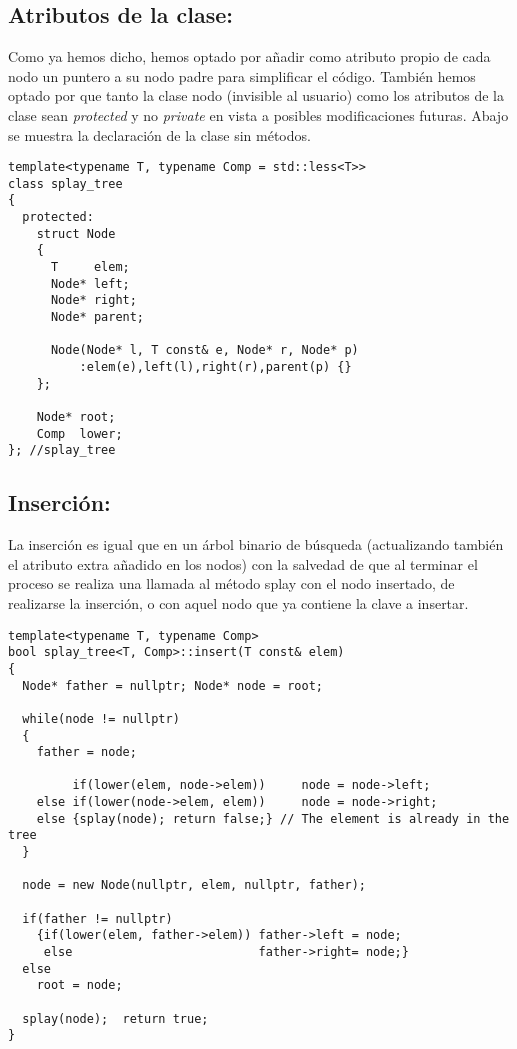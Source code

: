 \documentclass[letterpaper,12pt]{article}
\begin{document}
\subsection{Atributos de la clase:}

Como ya hemos dicho, hemos optado por añadir como atributo propio de cada nodo
un puntero a su nodo padre para simplificar el código. También hemos optado
por que tanto la clase nodo (invisible al usuario) como los atributos de la 
clase sean \textit{protected} y no \textit{private} en vista a posibles 
modificaciones futuras. Abajo se muestra la declaración de la clase sin
métodos.

\begin{lstlisting}
template<typename T, typename Comp = std::less<T>>
class splay_tree
{
  protected:
    struct Node
    {
      T     elem;
      Node* left;
      Node* right;
      Node* parent;

      Node(Node* l, T const& e, Node* r, Node* p) 
          :elem(e),left(l),right(r),parent(p) {}
    };

    Node* root;
    Comp  lower;
}; //splay_tree
\end{lstlisting}

\subsection{Inserción:}

La inserción es igual que en un árbol binario de búsqueda (actualizando 
también el atributo extra añadido en los nodos) con la salvedad de que al
terminar el proceso se realiza una llamada al método splay con el nodo 
insertado, de realizarse la inserción, o con aquel nodo que ya contiene la 
clave a insertar.

\begin{lstlisting}
template<typename T, typename Comp>
bool splay_tree<T, Comp>::insert(T const& elem)
{
  Node* father = nullptr; Node* node = root;

  while(node != nullptr)
  {
    father = node;

         if(lower(elem, node->elem))     node = node->left;
    else if(lower(node->elem, elem))     node = node->right;
    else {splay(node); return false;} // The element is already in the tree
  }

  node = new Node(nullptr, elem, nullptr, father);

  if(father != nullptr)
    {if(lower(elem, father->elem)) father->left = node;
     else                          father->right= node;}
  else
    root = node;

  splay(node);  return true;
}
\end{lstlisting}
\end{document}
